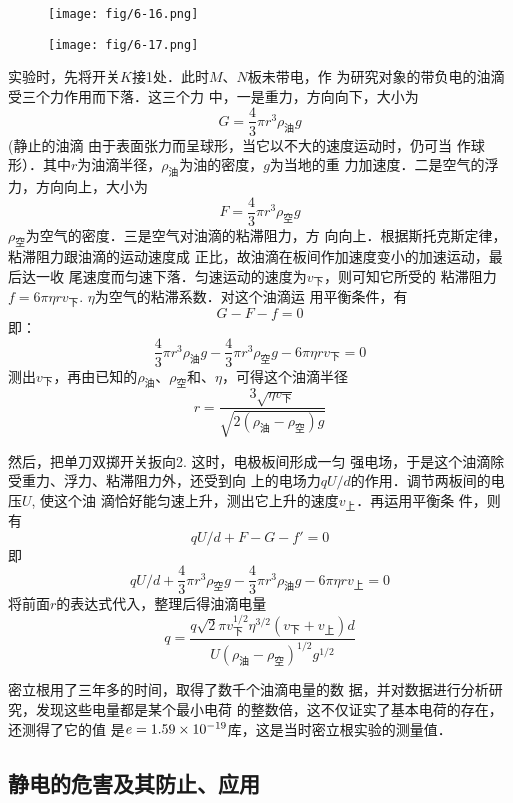 \begin{figure}[htp]\centering
    \begin{minipage}[t]{0.48\textwidth}
    \centering
    \texttt{[image: fig/6-16.png]}
    \caption{}
    \end{minipage}
    \begin{minipage}[t]{0.48\textwidth}
    \centering
    \texttt{[image: fig/6-17.png]}
    \caption{}
    \end{minipage}
    \end{figure}

实验时，先将开关$K$接1处．此时$M$、$N$板未带电，作
为研究对象的带负电的油滴受三个力作用而下落．这三个力
中，一是重力，方向向下，大小为
\[G=\frac{4}{3}\pi r^3\rho_{\text{油}}g\]
(静止的油滴
由于表面张力而呈球形，当它以不大的速度运动时，仍可当
作球形）．其中$r$为油滴半径，$\rho_{\text{油}}$为油的密度，$g$为当地的重
力加速度．二是空气的浮力，方向向上，大小为
\[F=\frac{4}{3}\pi r^3 \rho_{\text{空}}g\]
$\rho_{\text{空}}$为空气的密度．三是空气对油滴的粘滞阻力，方
向向上．根据斯托克斯定律，粘滞阻力跟油滴的运动速度成
正比，故油滴在板间作加速度变小的加速运动，最后达一收
尾速度而匀速下落．匀速运动的速度为$v_{\text{下}}$，则可知它所受的
粘滞阻力$f=6\pi\eta rv_{\text{下}}$. $\eta$为空气的粘滞系数．对这个油滴运
用平衡条件，有
\[G-F-f=0\]
即：
\[\frac{4}{3}\pi r^3\rho_{\text{油}}g-\frac{4}{3}\pi r^3\rho_{\text{空}}g-6\pi\eta rv_{\text{下}}=0\]
测出$v_{\text{下}}$，再由已知的$\rho_{\text{油}}$、$\rho_{\text{空}}$和、$\eta$，可得这个油滴半径
\[r=\frac{3\sqrt{\eta v_{\text{下}}}}{\sqrt{2(\rho_{\text{油}}-\rho_{\text{空}})g}}\]

然后，把单刀双掷开关扳向2. 这时，电极板间形成一匀
强电场，于是这个油滴除受重力、浮力、粘滞阻力外，还受到向
上的电场力$qU/d$的作用．调节两板间的电压$U$, 使这个油
滴恰好能匀速上升，测出它上升的速度$v_{\text{上}}$．再运用平衡条
件，则有
\[qU/d+F-G-f'=0\]
即
\[qU/d+\frac{4}{3}\pi r^3\rho_{\text{空}}g-\frac{4}{3}\pi r^3\rho_{\text{油}}g-6\pi\eta rv_{\text{上}}=0\]
将前面$r$的表达式代入，整理后得油滴电量
\[q=\frac{q\sqrt{2}\pi v_{\text{下}}^{1/2} \eta^{3/2}(v_{\text{下}}+v_{\text{上}})d}{U(\rho_{\text{油}}-\rho_{\text{空}})^{1/2}g^{1/2}}\]

密立根用了三年多的时间，取得了数千个油滴电量的数
据，并对数据进行分析研究，发现这些电量都是某个最小电荷
的整数倍，这不仅证实了基本电荷的存在，还测得了它的值
是$e=1.59\times10^{-19}$库，这是当时密立根实验的测量值．

\subsection{静电的危害及其防止、应用}

